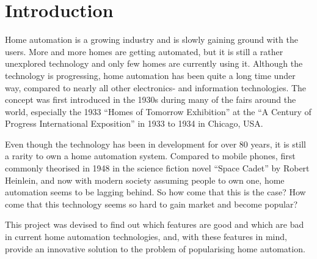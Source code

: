 \chapter{Introduction}\label{part:introduction}

Home automation is a growing industry and is slowly gaining ground with the users. More and more homes are getting automated, but it is still a rather unexplored technology and only few homes are currently using it. Although the technology is progressing, home automation has been quite a long time under way, compared to nearly all other electronics- and information technologies. The concept was first introduced in the 1930s during many of the fairs around the world, especially the 1933 \enquote{Homes of Tomorrow Exhibition} at the \enquote{A Century of Progress International Exposition} in 1933 to 1934 in Chicago, USA.

Even though the technology has been in development for over 80 years, it is still a rarity to own a home automation system. Compared to mobile phones, first commonly theorised in 1948 in the science fiction novel \enquote{Space Cadet} by Robert Heinlein, and now with modern society assuming people to own one, home automation seems to be lagging behind. So how come that this is the case? How come that this technology seems so hard to gain market and become popular?

This project was devised to find out which features are good and which are bad in current home automation technologies, and, with these features in mind, provide an innovative solution to the problem of popularising home automation.

